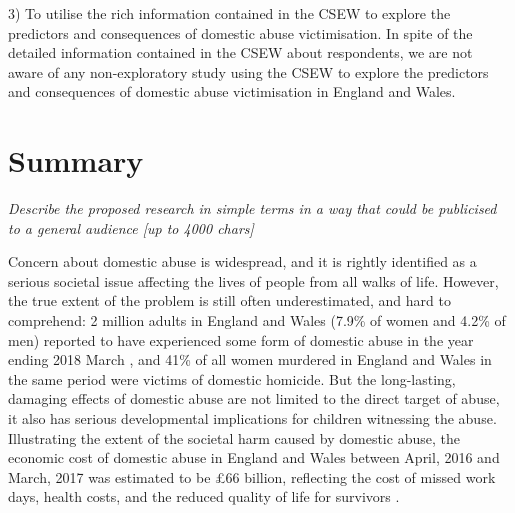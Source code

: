 \documentclass[11pt, a4paper]{article}
\begin{document}
3) To utilise the rich information contained in the CSEW to explore the predictors and consequences of domestic abuse victimisation. In spite of the detailed information contained in the CSEW about respondents, we are not aware of any non-exploratory study using the CSEW to explore the predictors and consequences of domestic abuse victimisation in England and Wales.   

   
\section{Summary}


%
%
%
%
%
%
%
%
%
%
%
%
%

\textit{Describe the proposed research in simple terms in a way that could be publicised to a general audience [up to 4000 chars]}

Concern about domestic abuse is widespread, and it is rightly identified as a serious societal issue affecting the lives of people from all walks of life. However, the true extent of the problem is still often underestimated, and hard to comprehend: 2 million adults in England and Wales (7.9\% of women and 4.2\% of men) reported to have experienced some form of domestic abuse in the year ending 2018 March \cite{ONS}, and 41\% of all women murdered in England and Wales in the same period were victims of domestic homicide. But the long-lasting, damaging effects of domestic abuse are not limited to the direct target of abuse, it also has serious developmental implications for children witnessing the abuse. Illustrating the extent of the societal harm caused by domestic abuse, the economic cost of domestic abuse in England and Wales between April, 2016 and March, 2017 was estimated to be \pounds 66 billion, reflecting the cost of missed work days, health costs, and the reduced quality of life for survivors \cite{costs}.
\end{document}
